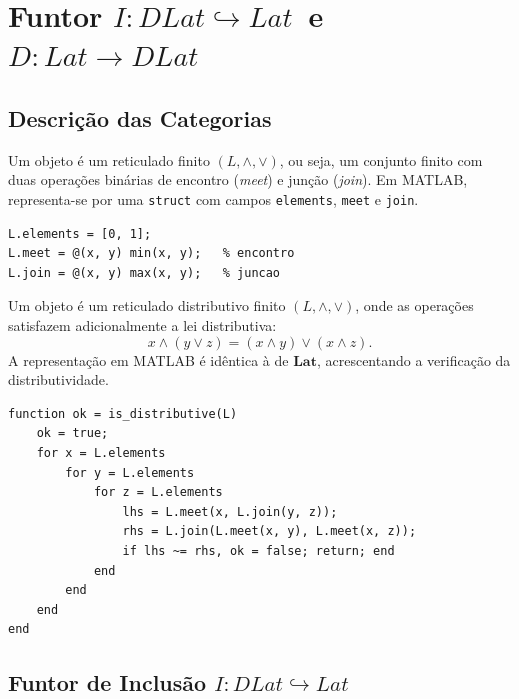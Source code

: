 \section{Funtor \texorpdfstring{$I: DLat \hookrightarrow Lat$\ e\ $D: Lat \to DLat$}{I: DLat -> Lat e D: Lat -> DLat}}
\label{sec:functor-lat-dlat}

\subsection{Descrição das Categorias}

\begin{definition}
Um objeto é um reticulado finito $(L, \wedge, \vee)$, ou seja, um conjunto finito com duas operações binárias de encontro (\emph{meet}) e junção (\emph{join}). Em MATLAB, representa-se por uma \texttt{struct} com campos \texttt{elements}, \texttt{meet} e \texttt{join}.
\end{definition}

\begin{lstlisting}[style=matlab, caption={Objeto em $\mathbf{Lat}$}]
L.elements = [0, 1];
L.meet = @(x, y) min(x, y);   % encontro
L.join = @(x, y) max(x, y);   % juncao
\end{lstlisting}

\begin{definition}
Um objeto é um reticulado distributivo finito $(L, \wedge, \vee)$, onde as operações satisfazem adicionalmente a lei distributiva:
\[
    x \wedge (y \vee z) = (x \wedge y) \vee (x \wedge z).
\]
A representação em MATLAB é idêntica à de $\mathbf{Lat}$, acrescentando a verificação da distributividade.
\end{definition}

\begin{lstlisting}[style=matlab, caption={Verificação da distributividade em $\mathbf{DLat}$}]
function ok = is_distributive(L)
    ok = true;
    for x = L.elements
        for y = L.elements
            for z = L.elements
                lhs = L.meet(x, L.join(y, z));
                rhs = L.join(L.meet(x, y), L.meet(x, z));
                if lhs ~= rhs, ok = false; return; end
            end
        end
    end
end
\end{lstlisting}

\subsection{Funtor de Inclusão \texorpdfstring{$I: DLat \hookrightarrow Lat$}{I: DLat -> Lat}}

